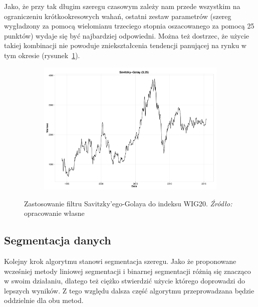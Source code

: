 \documentclass[polish, twoside, 12pt, a4paper]{article}
\theoremstyle{definition}
\theoremstyle{plain}
\theoremstyle{remark}
\begin{document}
Jako, że przy tak długim szeregu czasowym zależy nam przede wszystkim na ograniczeniu krótkookresowych wahań, ostatni zestaw parametrów (szereg wygładzony za pomocą wielomianu trzeciego stopnia oszacowanego 
za pomocą 25 punktów) wydaje się być najbardziej odpowiedni. Można też dostrzec, że użycie takiej kombinacji nie powoduje zniekształcenia tendencji panującej na rynku w tym okresie (rysunek~\ref{rys002}).

\begin{figure}[H]
  \centering

  \begin{subfigure}[t]{1.00\textwidth}
    \includegraphics[width=\textwidth]{./rys002}
  \end{subfigure}

  \captionsetup{margin=10pt,font=small,labelfont=bf,width=.8\textwidth}

  \caption[Użyty filtr Savitzky'ego-Golaya]{Zastosowanie filtru Savitzky'ego-Golaya do indeksu WIG20. \textit{Źródło:} opracowanie własne}\label{rys002}
\end{figure}

\subsection{Segmentacja danych}

Kolejny krok algorytmu stanowi segmentacja szeregu. Jako że proponowane wcześniej metody liniowej segmentacji i binarnej segmentacji różnią się znacząco w swoim działaniu, dlatego też ciężko stwierdzić użycie 
którego doprowadzi do lepszych wyników. Z tego względu dalsza część algorytmu przeprowadzana będzie oddzielnie dla obu metod.
\end{document}
